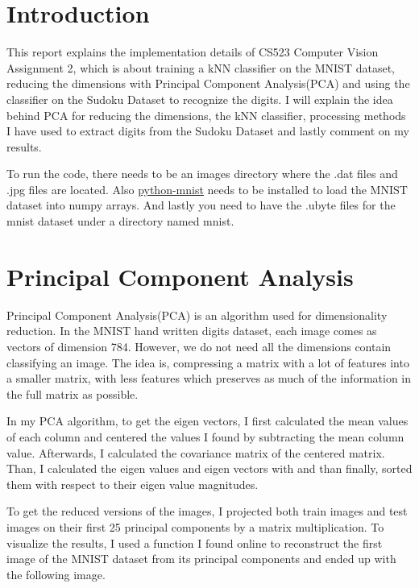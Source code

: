 \section*{Introduction}

This report explains the implementation details of CS523 Computer Vision
Assignment 2, which is about training a kNN classifier on the MNIST dataset,
reducing the dimensions with Principal Component Analysis(PCA) and using the
classifier on the Sudoku Dataset to recognize the digits. I will explain the
idea behind PCA for reducing the dimensions, the kNN classifier, processing
methods I have used to extract digits from the Sudoku Dataset and lastly comment
on my results.

To run the code, there needs to be an images directory where the .dat files and
.jpg files are located. Also
\href{https://pypi.org/project/python-mnist/} {python-mnist} needs to be
installed to load the MNIST dataset into numpy arrays. And lastly you need to
have the .ubyte files for the mnist dataset under a directory named mnist.


\section*{Principal Component Analysis}

Principal Component Analysis(PCA) is an algorithm used for dimensionality
reduction. In the MNIST hand written digits dataset, each image comes as vectors
of dimension 784. However, we do not need all the dimensions contain classifying
an image.  The idea is, compressing a matrix with a lot of features into a
smaller matrix, with less features which preserves as much of the information in
the full matrix as possible.

In my PCA algorithm, to get the eigen vectors, I first calculated the mean
values of each column and centered the values I found by subtracting the mean
column value. Afterwards, I calculated the covariance matrix of the centered
matrix. Than, I calculated the eigen values and eigen vectors with and than
finally, sorted them with respect to their eigen value magnitudes.

To get the reduced versions of the images, I projected both train images and
test images on their first 25 principal components by a matrix multiplication.
To visualize the results, I used a function I found online to reconstruct the
first image of the MNIST dataset from its principal components and ended up with
the following image.

